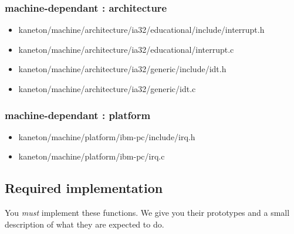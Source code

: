 \subsubsection{\color{filerefcolor} machine-dependant : architecture}
\begin{itemize}
\item kaneton/machine/architecture/ia32/educational/include/interrupt.h
\item kaneton/machine/architecture/ia32/educational/interrupt.c
\item kaneton/machine/architecture/ia32/generic/include/idt.h
\item kaneton/machine/architecture/ia32/generic/idt.c
\end{itemize}

\subsubsection{\color{filerefcolor} machine-dependant : platform}
\begin{itemize}
\item kaneton/machine/platform/ibm-pc/include/irq.h
\item kaneton/machine/platform/ibm-pc/irq.c
\end{itemize}

\newpage
\subsection*{Required implementation}
You \textit{must} implement these functions. We give you their prototypes
and a small description of what they are expected to do.

